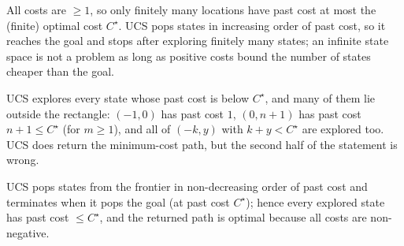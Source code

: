 \begin{solution}
\begin{description}[nosep]
  \item[(i) False.] All costs are $\ge1$, so only finitely many locations have past cost at most the (finite)
  optimal cost $C^\star$. UCS pops states in increasing order of past cost, so it reaches the goal and stops
  after exploring finitely many states; an infinite state space is not a problem as long as positive costs
  bound the number of states cheaper than the goal.
  \item[(ii) False.] UCS explores every state whose past cost is below $C^\star$, and many of them lie outside
  the rectangle: $(-1,0)$ has past cost $1$, $(0,n+1)$ has past cost $n+1\le C^\star$ (for $m\ge1$), and all
  of $(-k,y)$ with $k+y<C^\star$ are explored too. UCS does return the minimum-cost path, but the second half
  of the statement is wrong.
  \item[(iii) True.] UCS pops states from the frontier in non-decreasing order of past cost and terminates when
  it pops the goal (at past cost $C^\star$); hence every explored state has past cost $\le C^\star$, and the
  returned path is optimal because all costs are non-negative.
\end{description}
\end{solution}

